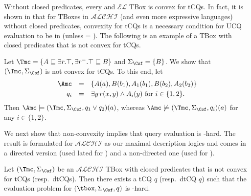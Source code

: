 \documentclass{lmcs}
\theoremstyle{definition}
\begin{document}
\smallskip
\noindent
Without closed predicates, every \dlliter and $\mathcal{EL}$ TBox is
convex for tCQs. In fact, it is shown in
\cite{DBLP:journals/lmcs/LutzW17,DBLP:conf/pods/HernichLPW17} that for
TBoxes in $\mathcal{ALCHI}$ (and even more expressive languages)
without closed predicates, convexity for tCQs is a necessary condition
for UCQ evaluation to be in \ptime (unless \ptime = \conp).  The
following is an example of a \dlliter TBox with closed predicates that
is not convex for tCQs.
%
\begin{exa}\label{ex1}
Let
$\Tmc = \{ A \sqsubseteq \exists r.\top, \exists
    r^{-}.\top\sqsubseteq B\}$ and $\Sigma_\Csf = \{ B \}$.
We show that $(\Tmc,\Sigma_\Csf)$ is not convex for tCQs. To this end, let
$$
\begin{array}{rcl}
    \Amc &=&
    \{A(a),B(b_{1}),A_{1}(b_{1}), B(b_{2}), A_{2}(b_{2})\} \\[1mm]
    q_i &=& \exists
    y \, r(x,y) \wedge A_i(y) %
    \text{ for } i \in \{1,2\}.
\end{array}
$$
Then $\Amc\models(\Tmc,\Sigma_\Csf,q_1 \vee q_2)(a)$, whereas
$\Amc \not\models (\Tmc,\Sigma_\Csf, q_{i})(a)$ for any $i \in \{1,2\}$.
\end{exa}
%
We next show that non-convexity implies that query evaluation is
\conp-hard. The result is formulated for $\mathcal{ALCHI}$ as our
maximal description logics and comes in a directed version (used lated
for \EL) and a non-directed one (used for \dlliter).
%
\begin{lem}\label{lem:nonconvex_imp_conp}
  Let $(\Tmc,\Sigma_\Csf)$ be an $\mathcal{ALCHI}$ TBox with closed predicates that is not 
  convex for tCQs (resp.\ dtCQs). Then there exists a tCQ $q$ (resp.\ dtCQ $q$) such that the  
  evaluation problem for $(\tbox,\Sigma_\Csf,q)$ is \conp-hard.
\end{lem}
\end{document}
